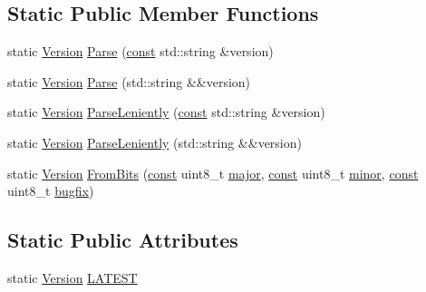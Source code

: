 \subsection*{Static Public Member Functions}
\begin{DoxyCompactItemize}
\item 
static \mbox{\hyperlink{classlucene_1_1core_1_1util_1_1Version}{Version}} \mbox{\hyperlink{classlucene_1_1core_1_1util_1_1Version_a10eba3883b2be5e104b3216260d8dc13}{Parse}} (\mbox{\hyperlink{ZlibCrc32_8h_a2c212835823e3c54a8ab6d95c652660e}{const}} std\+::string \&version)
\item 
static \mbox{\hyperlink{classlucene_1_1core_1_1util_1_1Version}{Version}} \mbox{\hyperlink{classlucene_1_1core_1_1util_1_1Version_a3e659501f448ebbac238fe1b3180a9bd}{Parse}} (std\+::string \&\&version)
\item 
static \mbox{\hyperlink{classlucene_1_1core_1_1util_1_1Version}{Version}} \mbox{\hyperlink{classlucene_1_1core_1_1util_1_1Version_a75bcf3afe30558ee4030bc33f4a50919}{Parse\+Leniently}} (\mbox{\hyperlink{ZlibCrc32_8h_a2c212835823e3c54a8ab6d95c652660e}{const}} std\+::string \&version)
\item 
static \mbox{\hyperlink{classlucene_1_1core_1_1util_1_1Version}{Version}} \mbox{\hyperlink{classlucene_1_1core_1_1util_1_1Version_afb83a6a64efd265dffa61c25ff6d5cba}{Parse\+Leniently}} (std\+::string \&\&version)
\item 
static \mbox{\hyperlink{classlucene_1_1core_1_1util_1_1Version}{Version}} \mbox{\hyperlink{classlucene_1_1core_1_1util_1_1Version_abe182afb477ee908c51a2bf3d484dbbd}{From\+Bits}} (\mbox{\hyperlink{ZlibCrc32_8h_a2c212835823e3c54a8ab6d95c652660e}{const}} uint8\+\_\+t \mbox{\hyperlink{classlucene_1_1core_1_1util_1_1Version_a11869713f07c51b2d75088bb352a564a}{major}}, \mbox{\hyperlink{ZlibCrc32_8h_a2c212835823e3c54a8ab6d95c652660e}{const}} uint8\+\_\+t \mbox{\hyperlink{classlucene_1_1core_1_1util_1_1Version_a87453ae1f193926a68af197d41cceee9}{minor}}, \mbox{\hyperlink{ZlibCrc32_8h_a2c212835823e3c54a8ab6d95c652660e}{const}} uint8\+\_\+t \mbox{\hyperlink{classlucene_1_1core_1_1util_1_1Version_ac787e4c7011225c89c1f677155d162f8}{bugfix}})
\end{DoxyCompactItemize}
\subsection*{Static Public Attributes}
\begin{DoxyCompactItemize}
\item 
static \mbox{\hyperlink{classlucene_1_1core_1_1util_1_1Version}{Version}} \mbox{\hyperlink{classlucene_1_1core_1_1util_1_1Version_af15c59aee2ac8af16ebc5f004a553b3d}{L\+A\+T\+E\+ST}}
\end{DoxyCompactItemize}
